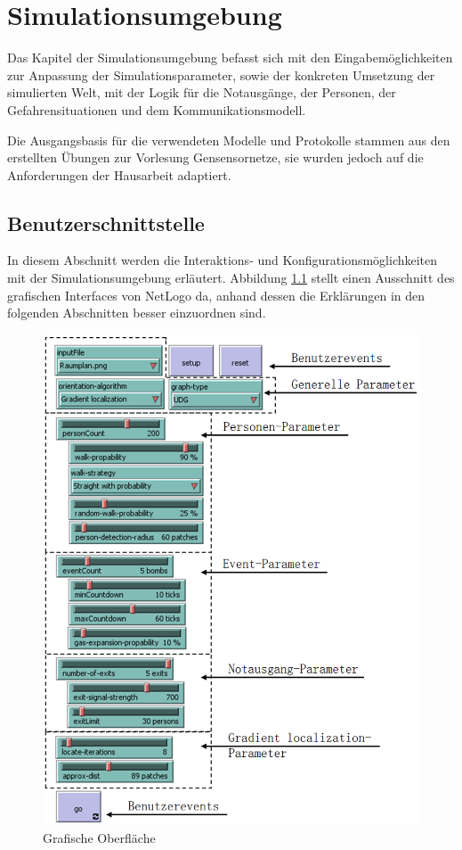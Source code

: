 \chapter{Simulationsumgebung}
\label{cha:simulationsumgebung}

Das Kapitel der Simulationsumgebung befasst sich mit den Eingabemöglichkeiten zur Anpassung der Simulationsparameter, sowie der konkreten Umsetzung der simulierten Welt, mit der Logik für die Notausgänge, der Personen, der Gefahrensituationen und dem Kommunikationsmodell.

Die Ausgangsbasis für die verwendeten Modelle und Protokolle stammen aus den erstellten Übungen zur Vorlesung Gensensornetze, sie wurden jedoch auf die Anforderungen der Hausarbeit adaptiert.




\section{Benutzerschnittstelle}
\label{sec:benutzerschnittstelle}

In diesem Abschnitt werden die Interaktions- und Konfigurationsmöglichkeiten mit der Simulationsumgebung erläutert. Abbildung \ref{fig:gui} stellt einen Ausschnitt des grafischen Interfaces von NetLogo da, anhand dessen die Erklärungen in den folgenden Abschnitten besser einzuordnen sind. 

\begin{figure}[!ht]
\centering
\includegraphics[height=0.85\textwidth]{simulationsumgebung/gui_3}
\caption{Grafische Oberfläche}
\label{fig:gui}
\end{figure}

